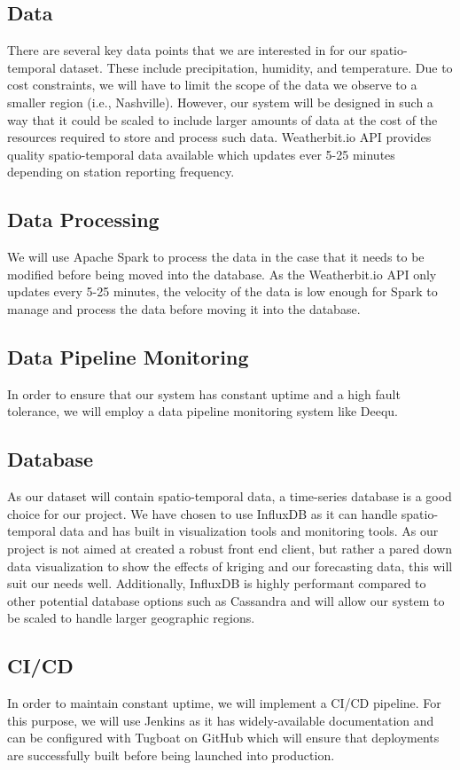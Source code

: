 \subsection{Data}
\noindent There are several key data points that we are interested in for our spatio-temporal dataset.
These include precipitation, humidity, and temperature.
Due to cost constraints, we will have to limit the scope of the data we observe to a smaller region (i.e., Nashville).
However, our system will be designed in such a way that it could be scaled to include larger amounts of data at the cost of the resources required to store and process such data.
Weatherbit.io API provides quality spatio-temporal data available which updates ever 5-25 minutes depending on station reporting frequency. 

\subsection{Data Processing}
\noindent We will use Apache Spark to process the data in the case that it needs to be modified before being moved into the database.
As the Weatherbit.io API only updates every 5-25 minutes, the velocity of the data is low enough for Spark to manage and process the data before moving it into the database.

\subsection{Data Pipeline Monitoring}
\noindent In order to ensure that our system has constant uptime and a high fault tolerance, we will employ a data pipeline monitoring system like Deequ. 

\subsection{Database}
\noindent As our dataset will contain spatio-temporal data, a time-series database is a good choice for our project.
We have chosen to use InfluxDB as it can handle spatio-temporal data and has built in visualization tools and monitoring tools.
As our project is not aimed at created a robust front end client, but rather a pared down data visualization to show the effects of kriging and our forecasting data, this will suit our needs well.
Additionally, InfluxDB is highly performant compared to other potential database options such as Cassandra and will allow our system to be scaled to handle larger geographic regions. 

\subsection{CI/CD}
\noindent In order to maintain constant uptime, we will implement a CI/CD pipeline.
For this purpose, we will use Jenkins as it has widely-available documentation and can be configured with Tugboat on GitHub which will ensure that deployments are successfully built before being launched into production. 

